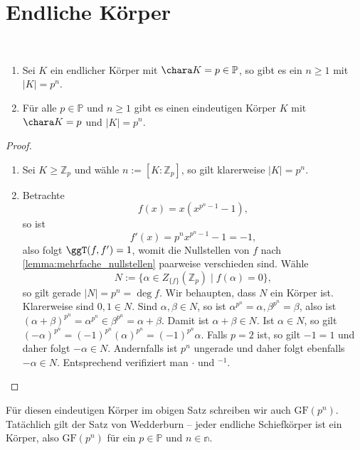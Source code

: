 \section{Endliche Körper}

\begin{theorem}{\ }
    \begin{enumerate}
        \item Sei $K$ ein endlicher Körper mit $\chara K = p \in \mathbb{P}$, so gibt es ein $n \geq 1$ mit $\vert K \vert = p^n$.
        \item Für alle $p \in \mathbb{P}$ und $n \geq 1$ gibt es einen eindeutigen Körper $K$ mit $\chara K = p$ und $\vert K \vert = p^n$.
    \end{enumerate}
\end{theorem}

\begin{proof}{\ }
    \begin{enumerate}
        \item Sei $K \geq \mathbb{Z}_p$ und wähle $n := [K : \mathbb{Z}_p]$, so gilt klarerweise $\vert K \vert = p^n$.
        \item Betrachte
        $$ f(x) = x(x^{p^n - 1} - 1), $$
        so ist
        $$ f'(x) = p^n x^{p^n - 1} - 1 = -1, $$
        also folgt $\ggT(f, f') = 1$, womit die Nullstellen von $f$ nach \cref*{lemma:mehrfache_nullstellen} paarweise verschieden sind. Wähle
        $$ N := \{ \alpha \in Z_{\{f\}}(\mathbb{Z}_p) \mid f(\alpha) = 0 \}, $$
        so gilt gerade $\vert N \vert = p^n = \deg f$. Wir behaupten, dass $N$ ein Körper ist. Klarerweise sind $0, 1 \in N$. Sind $\alpha, \beta \in N$, so ist $\alpha^{p^n} = \alpha, \beta^{p^n} = \beta$, also ist $(\alpha + \beta)^{p^n} = \alpha^{p^n} \in \beta^{p^n} = \alpha + \beta$. Damit ist $\alpha + \beta \in N$. 
        Ist $\alpha\in N$, so gilt $(-\alpha)^{p^n}=(-1)^{p^n}(\alpha)^{p^n}=(-1)^{p^n}\alpha$. Falls $p=2$ ist, so gilt $-1=1$ und daher folgt $-\alpha\in N$. Andernfalls ist $p^n$ ungerade und daher folgt ebenfalls $-\alpha\in N$.
        Entsprechend verifiziert man $\cdot$ und ${}^{-1}$.
    \end{enumerate}
\end{proof}

\begin{remark}
    Für diesen eindeutigen Körper im obigen Satz schreiben wir auch $\mathrm{GF}(p^n)$. Tatächlich gilt der Satz von Wedderburn -- jeder endliche Schiefkörper ist ein Körper, also $\mathrm{GF}(p^n)$ für ein $p\in\mathbb{P}$ und $n\in\mathbb{n}$.
\end{remark}

